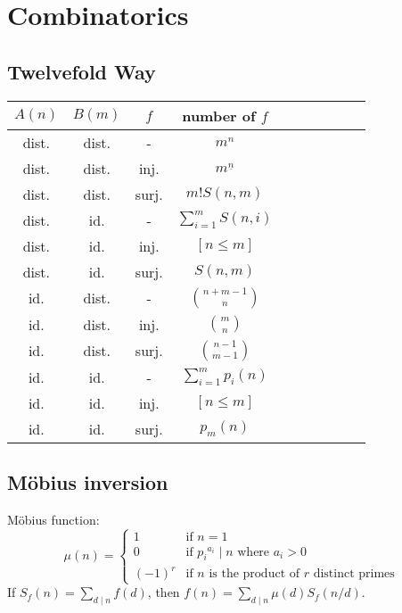 \section{Combinatorics}
\subsection{Twelvefold Way}
\begin{table}[h]
  \centering
  \begin{tabular}{|c|c|c|c|c|c|c|c|c|c|}
  \hline
  $A (n)$ & $B (m)$ & $f$ & number of $f$ \\ \hline
  dist. & dist. & - & $m^n$ \\ \hline
  dist. & dist. & inj. & $m^{\underline{n}}$ \\ \hline
  dist. & dist. & surj. & $m! S(n, m)$ \\ \hline
  dist. & id. & - & $\sum_{i=1}^m S(n, i)$ \\ \hline
  dist. & id. & inj. & $[n \leq m]$ \\ \hline
  dist. & id. & surj. & $S(n, m)$ \\ \hline
  id. & dist. & - & $\binom{n+m-1}{n}$ \\ \hline
  id. & dist. & inj. & $\binom{m}{n}$ \\ \hline
  id. & dist. & surj. & $\binom{n-1}{m-1}$ \\ \hline
  id. & id. & - & $\sum_{i=1}^m p_i(n)$ \\ \hline
  id. & id. & inj. & $[n \leq m]$ \\ \hline
  id. & id. & surj. & $p_m(n)$ \\ \hline
  \end{tabular}
\end{table}

\subsection{M\"{o}bius inversion}
M\"{o}bius function:
$$ \mu(n) = \begin{cases} 1 & \text{if } n=1  \\ 0 & \text{if } {p_i}^{a_i} \mid n \text{ where } a_i > 0 \\ (-1)^r & \text{if } n \text{ is the product of } r \text{ distinct primes} \end{cases} $$
If $S_f(n) = \sum_{d \mid n} f(d)$, then $f(n) = \sum_{d \mid n} \mu(d) S_f(n/d)$.

